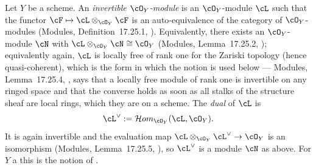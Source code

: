 \begin{definition}
\label{def:pc-invertible-module}
Let $Y$ be a scheme.  An \emph{invertible $\cO_Y$-module} is an
$\cO_Y$-module $\cL$ such that the functor
$\cF\mapsto\cL\otimes_{\cO_Y}\cF$ is an auto-equivalence of the category
of $\cO_Y$-modules (Modules, Definition~17.25.1,
).  Equivalently, there exists an $\cO_Y$-module
$\cN$ with $\cL\otimes_{\cO_Y}\cN\cong\cO_Y$ (Modules, Lemma~17.25.2,
); equivalently again, $\cL$ is locally free of rank
one for the Zariski topology (hence quasi-coherent), which is the form
in which the notion is used below --- Modules, Lemma~17.25.4,
, says that a locally free module of rank one is
invertible on any ringed space and that the converse holds as soon as
all stalks of the structure sheaf are local rings, which they are on a
scheme.  The \emph{dual} of $\cL$ is
\[
\cL^\vee:=\mathcal{H}om_{\cO_Y}(\cL,\cO_Y).
\]
It is again invertible and the evaluation map
$\cL\otimes_{\cO_Y}\cL^\vee\to\cO_Y$ is an isomorphism (Modules,
Lemma~17.25.5, ), so $\cL^\vee$ is a module $\cN$ as
above.  For $Y$ a  this is the notion of
.
\leanok
{}
\end{definition}

